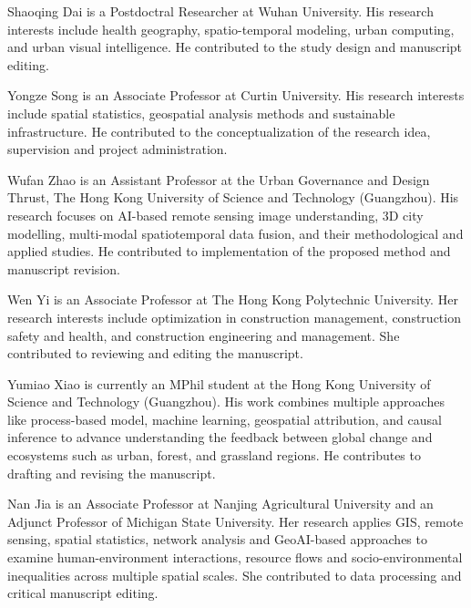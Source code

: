 \documentclass[authoryear,preprint,review,12pt]{elsarticle}
\begin{document}
Shaoqing Dai is a Postdoctral Researcher at Wuhan University. His research interests include health geography, spatio-temporal modeling, urban computing, and urban visual intelligence. He contributed to the study design and manuscript editing.

Yongze Song is an Associate Professor at Curtin University. His research interests include spatial statistics, geospatial analysis methods and sustainable infrastructure. He contributed to the conceptualization of the research idea, supervision and project administration.

Wufan Zhao is an Assistant Professor at the Urban Governance and Design Thrust, The Hong Kong University of Science and Technology (Guangzhou). His research focuses on AI-based remote sensing image understanding, 3D city modelling, multi-modal spatiotemporal data fusion, and their methodological and applied studies. He contributed to implementation of the proposed method and manuscript revision.

Wen Yi is an Associate Professor at The Hong Kong Polytechnic University. Her research interests include optimization in construction management, construction safety and health, and construction engineering and management. She contributed to reviewing and editing the manuscript.

Yumiao Xiao is currently an MPhil student at the Hong Kong University of Science and Technology (Guangzhou). His work combines multiple approaches like process-based model, machine learning, geospatial attribution, and causal inference to advance understanding the feedback between global change and ecosystems such as urban, forest, and grassland regions. He contributes to drafting and revising the manuscript.

Nan Jia is an Associate Professor at Nanjing Agricultural University and an Adjunct Professor of Michigan State University. Her research applies GIS, remote sensing, spatial statistics, network analysis and GeoAI-based approaches to examine human-environment interactions, resource flows and socio-environmental inequalities across multiple spatial scales. She contributed to data processing and critical manuscript editing.

\baselineskip12pt
 
 
\end{document}

